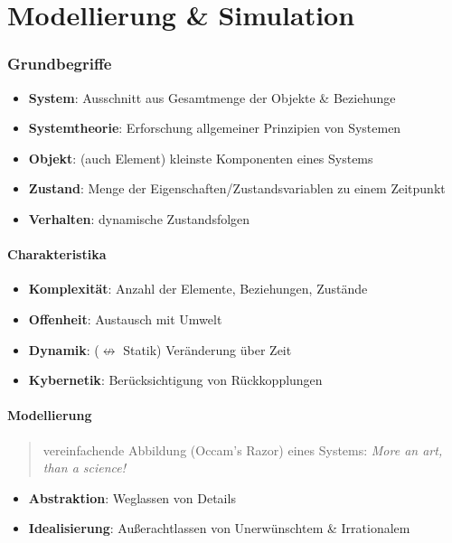 \documentclass{article}
\author{Leopold Lemmermann}
\begin{document}
\createtitle

\part{Modellierung \& Simulation}

\section{Grundbegriffe}


\begin{itemize}
  \item \textbf{System}: Ausschnitt aus Gesamtmenge der Objekte \& Beziehunge
  \item \textbf{Systemtheorie}: Erforschung allgemeiner Prinzipien von Systemen
  \item \textbf{Objekt}: (auch Element) kleinste Komponenten eines Systems
  \item \textbf{Zustand}: Menge der Eigenschaften/Zustandsvariablen zu einem Zeitpunkt
  \item \textbf{Verhalten}: dynamische Zustandsfolgen
\end{itemize}

\subsection{Charakteristika}
\begin{itemize}
  \item \textbf{Komplexität}: Anzahl der Elemente, Beziehungen, Zustände
  \item \textbf{Offenheit}: Austausch mit Umwelt
  \item \textbf{Dynamik}: ($\not\leftrightarrow$ Statik) Veränderung über Zeit
  \item \textbf{Kybernetik}: Berücksichtigung von Rückkopplungen
\end{itemize}

\subsection{Modellierung}
\begin{quote}vereinfachende Abbildung (Occam's Razor) eines Systems: \textit{More an art, than a science!}\end{quote}

\begin{itemize}
  \item \textbf{Abstraktion}: Weglassen von Details
  \item \textbf{Idealisierung}: Außerachtlassen von Unerwünschtem \& Irrationalem
\end{itemize}
\end{document}
